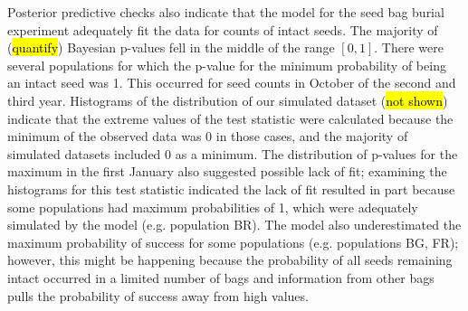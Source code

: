 \documentclass[12pt, oneside, titlepage]{article}   	%
\begin{document}
Posterior predictive checks also indicate that the model for the seed bag burial experiment adequately fit the data for counts of intact seeds. The majority of (\hl{quantify}) Bayesian p-values fell in the middle of the range $[0,1]$. There were several populations for which the p-value for the minimum probability of being an intact seed was 1. This occurred for seed counts in October of the second and third year. Histograms of the distribution of our simulated dataset (\hl{not shown}) indicate that the extreme values of the test statistic were calculated because the minimum of the observed data was 0 in those cases, and the majority of simulated datasets included 0 as a minimum. The distribution of p-values for the maximum in the first January also suggested possible lack of fit; examining the histograms for this test statistic indicated the lack of fit resulted in part because some populations had maximum probabilities of 1, which were adequately simulated by the model (e.g. population BR). The model also underestimated the maximum probability of success for some populations (e.g. populations BG, FR); however, this might be happening because the probability of all seeds remaining intact occurred in a limited number of bags and information from other bags pulls the probability of success away from high values. 
\end{document}
